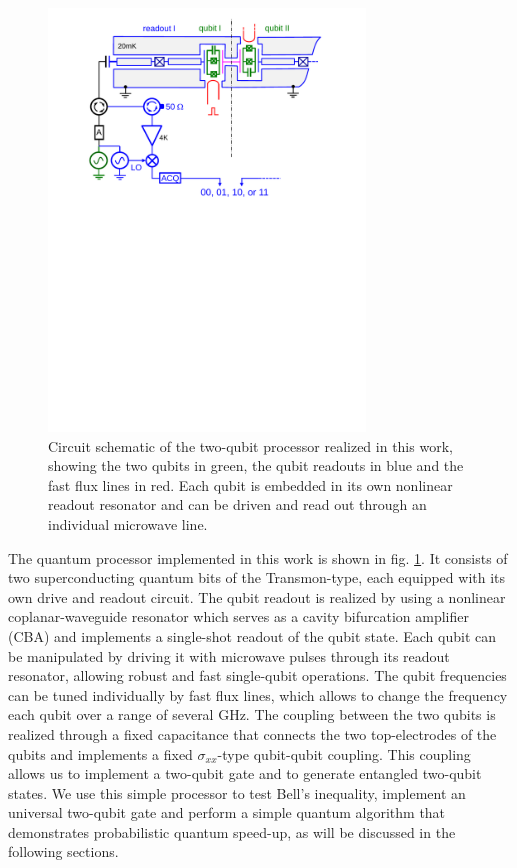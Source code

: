 \begin{figure}[ht!]
	\centering
		\includegraphics[width=0.75\textwidth]{./material/papers/grover/figures/2_qubit_processor_schematic}
	\caption[Circuit schematic of the realized two-qubit processor]{Circuit schematic of the two-qubit processor realized in this work, showing the two qubits in green, the qubit readouts in blue and the fast flux lines in red. Each qubit is embedded in its own nonlinear readout resonator and can be driven and read out through an individual microwave line.}
	\label{fig:two_qubit_processor_schematic}
\end{figure}

The quantum processor implemented in this work is shown in fig. \ref{fig:two_qubit_processor_schematic}. It consists of two superconducting quantum bits of the Transmon-type, each equipped with its own drive and readout circuit. The qubit readout is realized by using a nonlinear coplanar-waveguide resonator which serves as a cavity bifurcation amplifier (CBA)\citep{vijay_invited_2009} and implements a single-shot readout of the qubit state. Each qubit can be manipulated by driving it with microwave pulses through its readout resonator, allowing robust and fast single-qubit operations. The qubit frequencies can be tuned individually by fast flux lines, which allows to change the frequency each qubit over a range of several GHz. The coupling between the two qubits is realized through a fixed capacitance that connects the two top-electrodes of the qubits and implements a fixed $\sigma_{xx}$-type qubit-qubit coupling. This coupling allows us to implement a two-qubit gate and to generate entangled two-qubit states. We use this simple processor to test Bell's inequality, implement an universal two-qubit gate and perform a simple quantum algorithm that demonstrates probabilistic quantum speed-up, as will be discussed in the following sections.

